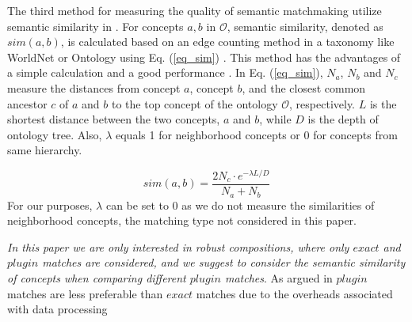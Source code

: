 The third method for measuring the quality of semantic matchmaking utilize semantic similarity in \cite{shet2012new}. For concepts $a, b$ in $\mathcal{O}$, semantic similarity, denoted as $sim(a, b)$, is calculated based on an edge counting method in a taxonomy like WorldNet or Ontology using Eq. (\ref{eq_sim}) \cite{shet2012new}. This method has the advantages of a simple calculation and a good performance . In Eq. (\ref{eq_sim}), $N_a$, $N_b$ and $N_c$ measure the distances from concept $a$, concept $b$, and the closest common ancestor $c$ of $a$ and $b$ to the top concept of the ontology $\mathcal{O}$, respectively.  $L$ is the shortest distance between the two concepts, $a$ and $b$, while $D$ is the depth of ontology tree. Also, $\lambda$ equals 1 for neighborhood concepts or 0 for concepts from same hierarchy.

\begin{equation}
sim(a, b){=} \frac{2N_c \cdot e^{-\lambda L/D} }{N_{a}+N_{b}}
\label{eq_sim}
\end{equation}
\noindent For our purposes, $\lambda$ can be set to 0 as we do not measure the similarities of neighborhood concepts, the matching type not considered in this paper. 

\emph{In this paper we are only interested in robust compositions, where only $exact$ and $plugin$ matches are considered, and we suggest to consider the semantic similarity of concepts when comparing different $plugin$ matches}. As argued in \cite{lecue2009optimizing} $plugin$ matches are less preferable than $exact$ matches due to the overheads associated with data processing


